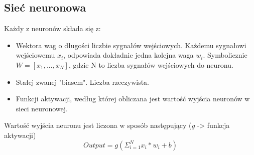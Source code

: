 \documentclass{article}
\begin{document}
	\subsection{Sieć neuronowa}
	Każdy z neuronów składa się z: 
	\begin{itemize}
		\item Wektora wag o długości liczbie sygnałów wejściowych. Każdemu sygnałowi wejściowemu $x_i$, odpowiada dokładnie jedna kolejna waga $w_i$. Symbolicznie $W = [x_1, ..., x_N]$, gdzie N to liczba sygnałów wejściowych do neuronu.
		\item Stałej zwanej "biasem". Liczba rzeczywista.
		\item Funkcji aktywacji, według której obliczana jest wartość wyjścia neuronów w sieci neuronowej.
	\end{itemize}
    Wartość wyjścia neuronu jest liczona w sposób następujący (\textit{g} -> funkcja aktywacji)
    \begin{equation}
    		Output = g(\Sigma_{i=1}^{N} x_i*w_i + b)
    \end{equation}
    
\end{document}
